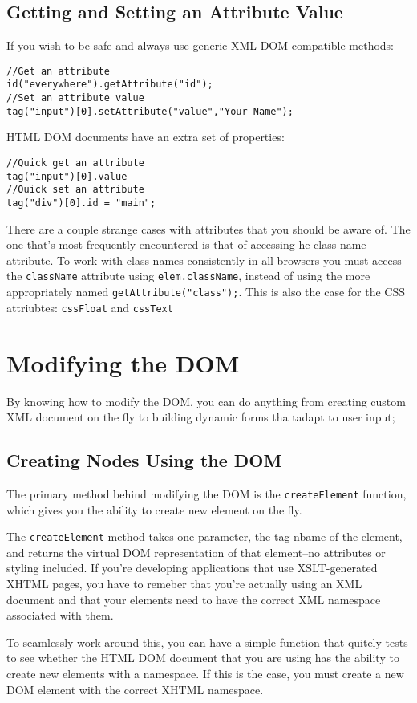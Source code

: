 \documentclass[a4paper,11pt]{book}
\begin{document}
\subsection{Getting and Setting an Attribute Value}
If you wish to be safe and always use generic XML DOM-compatible methods:
\begin{verbatim}
//Get an attribute
id("everywhere").getAttribute("id");
//Set an attribute value
tag("input")[0].setAttribute("value","Your Name");
\end{verbatim}
HTML DOM documents have an extra set of properties:
\begin{verbatim}
//Quick get an attribute
tag("input")[0].value
//Quick set an attribute
tag("div")[0].id = "main";
\end{verbatim}
There are a couple strange cases with attributes that you should be aware of.
The one that's most frequently encountered is that of accessing he class name
attribute. To work with class names consistently in all browsers you must access
the \verb|className| attribute using \verb|elem.className|, instead of using the
more appropriately named \verb|getAttribute("class");|. This is also the case
for the CSS attriubtes: \verb|cssFloat| and \verb|cssText|
\section{Modifying the DOM}
By knowing how to modify the DOM, you can do anything from creating custom XML
document on the fly to building dynamic forms tha tadapt to user input;
\subsection{Creating Nodes Using the DOM}
The primary method behind modifying the DOM is the \verb|createElement|
function, which gives you the ability to create new element on the fly. 

The \verb|createElement| method takes one parameter, the tag nbame of the
element, and returns the virtual DOM representation of that element--no
attributes or styling included.  If you're developing applications that use
XSLT-generated XHTML pages, you have to remeber that you're actually using an
XML document and that your elements need to have the correct XML namespace
associated with them.

To seamlessly work around this, you can have a simple function that quitely
tests to see whether the HTML DOM document that you are using has the ability to
create new elements with a namespace. If this is the case, you must create a new
DOM element with the correct XHTML namespace.
\end{document}
